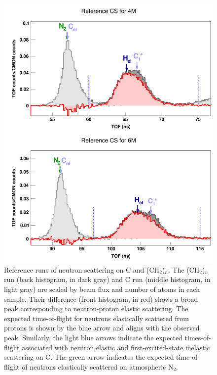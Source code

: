 \begin{figure}[tb]
    \centering
    \includegraphics[height=0.7\textheight]{figures/ECSReferenceRuns.png}
    \caption[Reference runs of neutron scattering on C and (CH$_{2}$)$_{n}$]
    {
        Reference runs of neutron scattering on C and (CH$_{2}$)$_{n}$.
        The (CH$_{2}$)$_{n}$ run (back histogram, in dark gray) and C run
        (middle histogram, in light gray) are scaled by beam flux and number of
        atoms in each sample. Their difference (front histogram, in red) shows a
        broad peak corresponding to neutron-proton elastic scattering. The
        expected time-of-flight for neutrons elastically scattered from protons
        is shown by the blue arrow and aligns with the observed peak. Similarly,
        the light blue arrows 
        indicate the expected times-of-flight associated with neutron elastic and
        first-excited-state inelastic scattering on C.
        The green arrow indicates the expected time-of-flight of 
        neutrons elastically scattered on atmospheric N$_{2}$.
    }
    \label{ECSReferenceRuns}
\end{figure}

